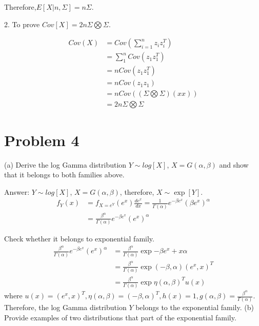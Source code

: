 \documentclass{article}
\begin{document}
Therefore,$E[X|n,\Sigma]=n\Sigma$.

2. To prove $Cov[X] = 2n\Sigma \bigotimes \Sigma$.

\begin{equation}
\begin{aligned}
    Cov(X) &= Cov\left(\sum_{i=1}^{n} z_{i}z_{i}^{T}\right) \\
    &= \sum_{1}^{n}Cov\left(z_{1}z_{1}^{T}\right) \\
    &= n Cov\left(z_{1}z_{1}^{T}\right)  \\
    &= n Cov\left(z_{1} \boxed{ } z_{1}\right) \\
    &= n Cov((\Sigma \bigotimes \Sigma)(x \boxed{ } x)) \\
    &= 2n\Sigma \bigotimes \Sigma
\end{aligned}
\end{equation}

\newpage
\section{Problem 4}
(a) Derive the log Gamma distribution $Y \sim log[X]$, $X= G(\alpha, \beta)$ and show that it belongs to both families above.

Answer:
$Y \sim log[X]$, $X= G(\alpha, \beta)$, therefore, $X \sim \exp[Y]$.
\begin{equation}
\begin{aligned}
    f_{Y}(x) & = f_{X=e^Y} (e^x) \frac{d e^x}{d x} = \frac{1}{\Gamma(\alpha)} e^{-\beta e^x}(\beta e^{x})^{\alpha} \\
    & = \frac{\beta^{\alpha}}{\Gamma(\alpha)} e^{-\beta e^x}(e^{x})^{\alpha}
\end{aligned}
\end{equation}

Check whether it belongs to exponential family.
\begin{equation}
\begin{aligned}
    \frac{\beta^{\alpha}}{\Gamma(\alpha)} e^{-\beta e^x}(e^{x})^{\alpha} & = \frac{\beta^{\alpha}}{\Gamma(\alpha)} \exp{-\beta e^x+x\alpha} \\
    & = \frac{\beta^{\alpha}}{\Gamma(\alpha)} \exp{(-\beta,\alpha)(e^x,x)^{T}} \\
    & = \frac{\beta^{\alpha}}{\Gamma(\alpha)} \exp{\eta(\alpha,\beta)^{T}u(x)} 
\end{aligned}
\end{equation}
where $u(x)=(e^x,x)^T, \eta(\alpha,\beta)=(-\beta,\alpha)^{T}, h(x)=1,g(\alpha,\beta)=\frac{\beta^{\alpha}}{\Gamma(\alpha)} $. Therefore, the log Gamma distribution $Y$ belongs to the exponential family.
\newline
(b) Provide examples of two distributions that part of the exponential family.
\end{document}
